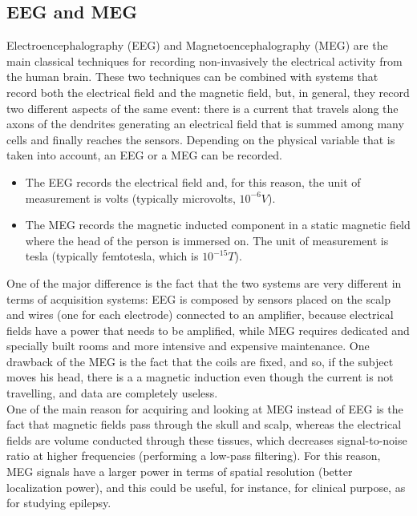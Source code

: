 \subsection{EEG and MEG}
Electroencephalography (EEG) and Magnetoencephalography (MEG) are the main classical techniques for recording 
non-invasively the electrical activity from the human brain. These two techniques can be combined with systems 
that record both the electrical field and the magnetic field, but, in general, they record two different aspects 
of the same event: there is a current that travels along the axons of the dendrites generating an electrical 
field that is summed among many cells and finally reaches the sensors. Depending on the physical variable that is 
taken into account, an EEG or a MEG can be recorded.
\begin{itemize}
    \item The EEG records the electrical field and, for this reason, the unit of measurement is volts (typically 
    microvolts, \(10^{-6} V\)).
    \item The MEG records the magnetic inducted component in a static magnetic field where the head of the person is 
    immersed on. The unit of measurement is tesla (typically femtotesla, which is \(10^{-15} T\)).
\end{itemize}
One of the major difference is the fact that the two systems are very different in terms of acquisition systems: EEG 
is composed by sensors placed on the scalp and wires (one for each electrode) connected to an amplifier, because 
electrical fields have a power that needs to be amplified, while MEG requires dedicated and specially built rooms and more 
intensive and expensive maintenance.
One drawback of the MEG is the fact that the coils are fixed, and so, if the subject moves his head, there is a 
a magnetic induction even though the current is not travelling, and data are completely useless.\\
One of the main reason for acquiring and looking at MEG instead of EEG is the fact that magnetic fields pass through the 
skull and scalp, whereas the electrical fields are volume conducted through these tissues, which decreases signal-to-noise 
ratio at higher frequencies (performing a low-pass filtering). For this reason, MEG signals have a larger power in terms of 
spatial resolution (better localization power), and this could be useful, for instance, for clinical purpose, as for studying 
epilepsy.

